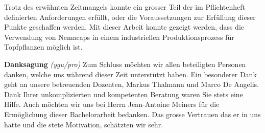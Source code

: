 Trotz des erwähnten Zeitmangels konnte ein grosser Teil der im Pflichtenheft definierten Anforderungen erfüllt, oder die Voraussetzungen zur Erfüllung dieser Punkte geschaffen werden. Mit dieser Arbeit konnte gezeigt werden, dass die Verwendung von Nemacaps in einem industriellen Produktionsprozess für Topfpflanzen möglich ist.
\newline

\textbf{Danksagung}
\newline
\textit{(ygu/pro)} Zum Schluss möchten wir allen beteiligten Personen danken, welche uns während dieser Zeit unterstützt haben. Ein besonderer Dank geht an unsere betreuenden Dozenten, Markus Thalmann und Marco De Angelis. Dank Ihrer unkomplizierten und kompetenten Beratung waren Sie stets eine Hilfe. Auch möchten wir uns bei Herrn Jean-Antoine Meiners für die Ermöglichung dieser Bachelorarbeit bedanken. Das grosse Vertrauen das er in uns hatte und die stete Motivation, schätzten wir sehr.

